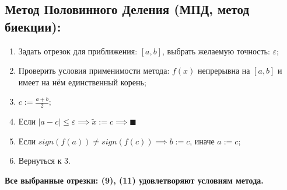 \subsection{Метод  Половинного Деления (МПД, метод биекции):}
\begin{enumerate}
    \item Задать отрезок для приближения: $[a, b]$, выбрать желаемую точность: $\varepsilon$;
    \item Проверить условия применимости метода: $f(x)$ непрерывна на $[a, b]$ и имеет на нём единственный корень;
    \item $c:=\frac{a+b}{2};$
    \item Если $|a-c|\le\varepsilon\implies \widetilde{x}:=c\implies\blacksquare$
    \item Если $sign(f(a)) \ne sign(f(c))\implies b:=c$, иначе $a:=c$;
    \item Вернуться к 3.
\end{enumerate}
{\bf Все выбранные отрезки: (9), (11) удовлетворяют условиям метода.}

